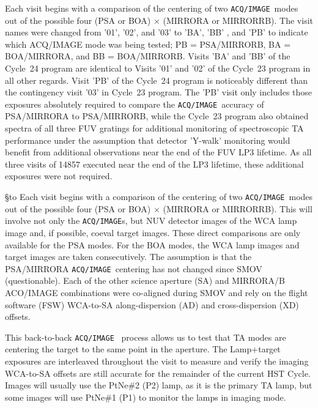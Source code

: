 \documentclass[12pt]{reportj}
\def\ssection#1{\addtocounter{section}{1} \setcounter{subsection}{0} \S*{\hbox to \hsize{\large\bf \arabic{section}. #1\hfill }}}
\begin{document}
Each visit begins with a comparison of the centering of two \texttt{ACQ/IMAGE}~modes out of the possible four (PSA or BOA) $\times$ (MIRRORA or MIRRORRB). The visit names were changed from '01', '02', and '03' to 'BA', 'BB' , and 'PB' to indicate which ACQ/IMAGE mode was being tested; PB = PSA/MIRRORB, BA = BOA/MIRRORA, and BB = BOA/MIRRORB. Visits 'BA' and 'BB' of the Cycle~24 program are identical to Visits '01' and '02' of the Cycle~23 program in all other regards.
Visit 'PB' of the Cycle~24 program is noticeably different than the contingency visit '03' in Cycle~23 program. The 'PB' visit only includes those exposures absolutely required to compare the \texttt{ACQ/IMAGE}~accuracy of PSA/MIRRORA to PSA/MIRRORB, while the Cycle~23 program also obtained spectra of all three FUV gratings for additional monitoring of spectroscopic TA performance under the assumption that detector 'Y-walk' monitoring would benefit from additional observations near the end of the FUV LP3 lifetime. As all three visits of 14857 executed near the end of the LP3 lifetime, these additional exposures were not required.
\clearpage
\ssection{Program Structure \label{sec:structure}}
Each visit begins with a comparison of the centering of two \texttt{ACQ/IMAGE}~modes out of the possible four (PSA or BOA) $\times$ (MIRRORA or MIRRORRB). This will involve not only the \texttt{ACQ/IMAGE}s, but NUV detector images of the WCA lamp image and, if possible, coeval target images. These direct comparisons are only available for the PSA modes. For the BOA modes, the WCA lamp images and target images are taken consecutively. The assumption is that the PSA/MIRRORA \texttt{ACQ/IMAGE}~centering has not changed since SMOV (questionable). Each of the other science aperture (SA) and MIRRORA/B ACO/IMAGE combinations were co-aligned during SMOV and rely on the flight software
(FSW) WCA-to-SA along-dispersion (AD) and cross-dispersion (XD) offsets.

This back-to-back \texttt{ACQ/IMAGE}~ process allows us to test that TA modes are centering the target to the same point in the aperture. The Lamp+target exposures are interleaved throughout the visit to measure and verify the imaging WCA-to-SA offsets are still accurate for the remainder of the current HST Cycle. Images will usually use the PtNe\#2 (P2) lamp, as it is the primary TA lamp, but some images will use PtNe\#1 (P1) to monitor the lamps in imaging mode.
\end{document}
